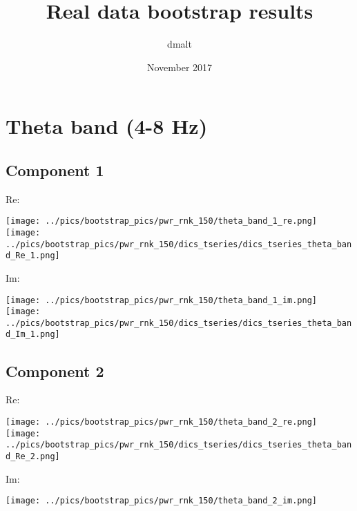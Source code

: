 \documentclass{article}
\title{Real data bootstrap results}
\author{dmalt}
\date{November 2017}
\begin{document}
\newpage
\section{Theta band (4-8 Hz)}
\subsection*{Component 1}
Re:

\hspace{2cm}
\texttt{[image: ../pics/bootstrap\_pics/pwr\_rnk\_150/theta\_band\_1\_re.png]}
\hspace{2cm}
\texttt{[image: ../pics/bootstrap\_pics/pwr\_rnk\_150/dics\_tseries/dics\_tseries\_theta\_band\_Re\_1.png]}

Im:

\hspace{2cm}
\texttt{[image: ../pics/bootstrap\_pics/pwr\_rnk\_150/theta\_band\_1\_im.png]}
\hspace{2cm}
\texttt{[image: ../pics/bootstrap\_pics/pwr\_rnk\_150/dics\_tseries/dics\_tseries\_theta\_band\_Im\_1.png]}

\subsection*{Component 2}
Re:

\hspace{2cm}
\texttt{[image: ../pics/bootstrap\_pics/pwr\_rnk\_150/theta\_band\_2\_re.png]}
\hspace{2cm}
\texttt{[image: ../pics/bootstrap\_pics/pwr\_rnk\_150/dics\_tseries/dics\_tseries\_theta\_band\_Re\_2.png]}


Im:

\hspace{2cm}
\texttt{[image: ../pics/bootstrap\_pics/pwr\_rnk\_150/theta\_band\_2\_im.png]}


\end{document}
